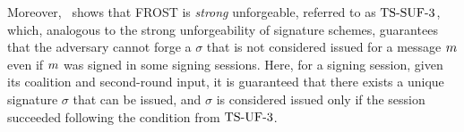 Moreover,~\cite{BellareCKMTZ22} shows that FROST is \emph{strong} unforgeable, referred to as $\mathrm{TS}\mbox{-}\mathrm{SUF}\mbox{-}{3}$, which, analogous to the strong unforgeability of signature schemes, guarantees that the adversary cannot forge a $\sigma$ that is not considered issued for a message $m$ even if $m$ was signed in some signing sessions. Here, for a signing session, given its coalition and second-round input, it is guaranteed that there exists a unique signature $\sigma$ that can be issued, and $\sigma$ is considered issued only if the session succeeded following the condition from $\mathrm{TS}\mbox{-}\mathrm{UF}\mbox{-}{3}$.



